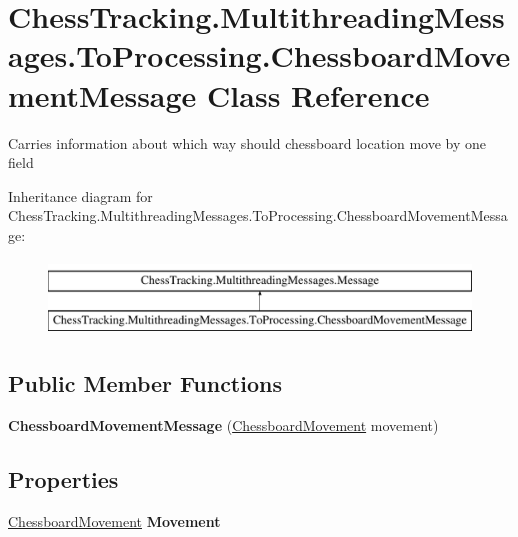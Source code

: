 \hypertarget{class_chess_tracking_1_1_multithreading_messages_1_1_to_processing_1_1_chessboard_movement_message}{}\section{Chess\+Tracking.\+Multithreading\+Messages.\+To\+Processing.\+Chessboard\+Movement\+Message Class Reference}
\label{class_chess_tracking_1_1_multithreading_messages_1_1_to_processing_1_1_chessboard_movement_message}


Carries information about which way should chessboard location move by one field  


Inheritance diagram for Chess\+Tracking.\+Multithreading\+Messages.\+To\+Processing.\+Chessboard\+Movement\+Message\+:\begin{figure}[H]
\begin{center}
\leavevmode
\includegraphics[height=2.000000cm]{class_chess_tracking_1_1_multithreading_messages_1_1_to_processing_1_1_chessboard_movement_message}
\end{center}
\end{figure}
\subsection*{Public Member Functions}
\begin{DoxyCompactItemize}
\item 
\mbox{\label{class_chess_tracking_1_1_multithreading_messages_1_1_to_processing_1_1_chessboard_movement_message_a9872e63dfde0967e1209c4db10dc8ec5}} 
{\bfseries Chessboard\+Movement\+Message} (\mbox{\hyperlink{namespace_chess_tracking_1_1_multithreading_messages_1_1_to_processing_af48751428f7a12d314dbbac688726bac}{Chessboard\+Movement}} movement)
\end{DoxyCompactItemize}
\subsection*{Properties}
\begin{DoxyCompactItemize}
\item 
\mbox{\label{class_chess_tracking_1_1_multithreading_messages_1_1_to_processing_1_1_chessboard_movement_message_a9f8b5eb730eafcabea92f74b5caee152}} 
\mbox{\hyperlink{namespace_chess_tracking_1_1_multithreading_messages_1_1_to_processing_af48751428f7a12d314dbbac688726bac}{Chessboard\+Movement}} {\bfseries Movement}
\end{DoxyCompactItemize}


